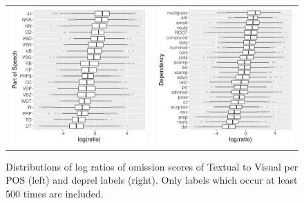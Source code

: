 \begin{figure}[t]
  \centering
  \hspace*{-0.2in}
  \setlength{\tabcolsep}{0pt}
  \begin{tabular}{cc}
  \includegraphics[scale=0.55]{imaginet-omission-ratio-pos-boxplot.png} &
  \includegraphics[scale=0.55]{imaginet-omission-ratio-dep-boxplot.png} \\  
  \end{tabular}
  \caption{Distributions of log ratios of omission scores of {\sc Textual} to {\sc Visual} per
    POS (left) and deprel labels (right). Only labels which occur at least 500 times are included.}
\label{fig:omission-imaginet-ratio}
\end{figure}


